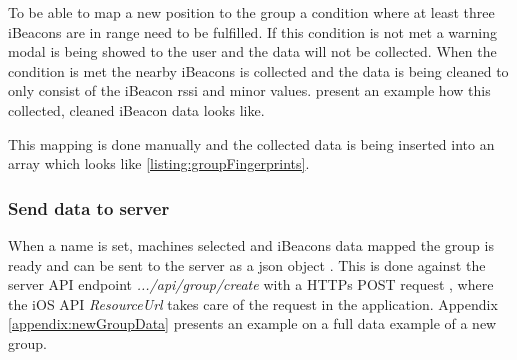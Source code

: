 \bigskip

To be able to map a new position to the group a condition where at least three iBeacons are in range need to be fulfilled.
If this condition is not met a warning modal is being showed to the user and the data will not be collected.
When the condition is met the nearby iBeacons is collected and the data is being cleaned to only consist of the iBeacon \acrshort{rssi} and minor values.
 present an example how this collected, cleaned iBeacon data looks like.


This mapping is done manually and the collected data is being inserted into an array which looks like \cref{listing:groupFingerprints}.


\subsubsection{Send data to server}\label{sec:implAppnewGroupSend}
When a name is set, machines selected and iBeacons data mapped the group is ready and can be sent to the server as a \acrfull{json} object \cite{IntroducingJSON}.
This is done against the server API endpoint \textit{.../api/group/create} with a HTTPs POST request \cite{POSTHTTPMDN}, where the iOS API \textit{ResourceUrl} \cite{ResourceURLAppleDeveloper} takes care of the request in the application.
Appendix \ref{appendix:newGroupData} presents an example on a full data example of a new group.

